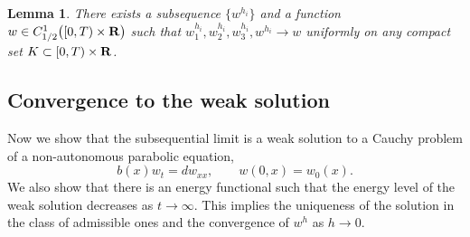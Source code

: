 \documentclass[11pt]{amsart}
\def\R{{\bf R}}
\def\R{{\bf R}}
\newtheorem{lemma}{Lemma}[section]
\begin{document}
\begin{lemma}\label{compactness} There exists a subsequence $\{w^{h_i}\}$ and a function $w\in C^1_{1/2}\big([0,T)\times \R\big)$ such that $w_1^{h_i},w_2^{h_i},w_3^{h_i},w^{h_i}\rightarrow w$ uniformly on any compact set $K \subset [0,T)\times \R$.
\end{lemma}


\subsection{Convergence to the weak solution}

Now we show that the subsequential limit is a weak solution to a
Cauchy problem of a non-autonomous parabolic equation,
\begin{equation}\label{eqnw}
   b(x) w_t = d w_{xx},\qquad w(0,x)=w_0(x).
\end{equation}
We also show that there is an energy functional such that the energy level of the weak solution decreases as $t\to\infty$. This implies the uniqueness of the solution in the class of admissible ones and the convergence of $w^h$ as $h\to0$.
\end{document}
